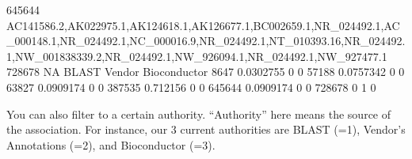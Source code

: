 \documentclass[a4paper]{article}
\begin{document}
\begin{Schunk}
\begin{Soutput}
645644                                                                                                                                                                                                                                                                                                                                                                                                                                                                                                                                                                                                                                                                                                                                                                                                                                                       AC141586.2,AK022975.1,AK124618.1,AK126677.1,BC002659.1,NR_024492.1,AC_000148.1,NR_024492.1,NC_000016.9,NR_024492.1,NT_010393.16,NR_024492.1,NW_001838339.2,NR_024492.1,NW_926094.1,NR_024492.1,NW_927477.1
728678                                                                                                                                                                                                                                                                                                                                                                                                                                                                                                                                                                                                                                                                                                                                                                                                                                                                                                                                                                                                                                                               NA
           BLAST Vendor Bioconductor
8647   0.0302755      0            0
57188  0.0757342      0            0
63827  0.0909174      0            0
387535  0.712156      0            0
645644 0.0909174      0            0
728678         0      1            0
\end{Soutput}
\end{Schunk}

You can also filter to a certain authority. ``Authority'' here means the source of the association. For instance, our 3 current authorities are BLAST (=1), Vendor's Annotations (=2), and Bioconductor (=3).
\end{document}
